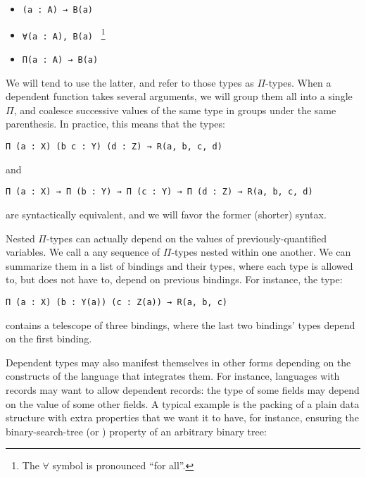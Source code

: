 \begin{itemize}

  \item \texttt{(a : A) → B(a)} %

  \item \texttt{∀(a : A), B(a)}
        ~\footnote{The $\forall$ symbol is pronounced ``for all''.}

  \item \texttt{Π(a : A) → B(a)} %

\end{itemize}

We will tend to use the latter, and refer to those types as $\Pi$-types.  When a
dependent function takes several arguments, we will group them all into a single
$\Pi$, and coalesce successive values of the same type in groups under the same
parenthesis.  In practice, this means that the types:

\begin{verbatim}
Π (a : X) (b c : Y) (d : Z) → R(a, b, c, d)
\end{verbatim}

and

\begin{verbatim}
Π (a : X) → Π (b : Y) → Π (c : Y) → Π (d : Z) → R(a, b, c, d)
\end{verbatim}

are syntactically equivalent, and we will favor the former (shorter) syntax.


Nested $\Pi$-types can actually depend on the values of previously-quantified
variables.  We call a  any sequence of $\Pi$-types
nested within one another.  We can summarize them in a list of bindings and
their types, where each type is allowed to, but does not have to, depend on
previous bindings.  For instance, the type:

\begin{verbatim}
Π (a : X) (b : Y(a)) (c : Z(a)) → R(a, b, c)
\end{verbatim}

contains a telescope of three bindings, where the last two bindings' types
depend on the first binding.

Dependent types may also manifest themselves in other forms depending on the
constructs of the language that integrates them.  For instance, languages with
records may want to allow dependent records: the type of some fields may depend
on the value of some other fields.  A typical example is the packing of a plain data structure with extra properties that we want it to have, for instance, ensuring the binary-search-tree (or ) property of an arbitrary binary tree:

